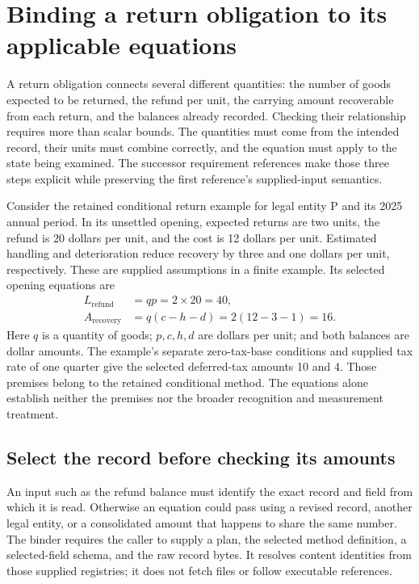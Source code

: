 \section{Binding a return obligation to its applicable equations}
\label{sec:requirement-successors}

A return obligation connects several different quantities: the number of goods
expected to be returned, the refund per unit, the carrying amount recoverable
from each return, and the balances already recorded. Checking their relationship
requires more than scalar bounds. The quantities must come from the intended
record, their units must combine correctly, and the equation must apply to the
state being examined. The successor requirement references make those three
steps explicit while preserving the first reference's supplied-input semantics.

Consider the retained conditional return example for legal entity P and its
2025 annual period. In its unsettled opening, expected returns are two units,
the refund is 20 dollars per unit, and the cost is 12 dollars per unit. Estimated
handling and deterioration reduce recovery by three and one dollars per unit,
respectively. These are supplied assumptions in a finite example. Its selected
opening equations are
\begin{align}
  L_{\mathrm{refund}} &= q p = 2\times20 = 40, \\
  A_{\mathrm{recovery}} &= q(c-h-d)
    = 2(12-3-1)=16.
\end{align}
Here $q$ is a quantity of goods; $p,c,h,d$ are dollars per unit; and both balances
are dollar amounts. The example's separate zero-tax-base conditions and supplied
tax rate of one quarter give the selected deferred-tax amounts 10 and 4. Those
premises belong to the retained conditional method. The equations alone establish
neither the premises nor the broader recognition and measurement treatment.

\subsection{Select the record before checking its amounts}

An input such as the refund balance must identify the exact record and field
from which it is read. Otherwise an equation could pass using a revised record,
another legal entity, or a consolidated amount that happens to share the same
number. The binder requires the caller to supply a plan, the selected method
definition, a selected-field schema, and the raw record bytes. It resolves
content identities from those supplied registries; it does not fetch files or
follow executable references.


